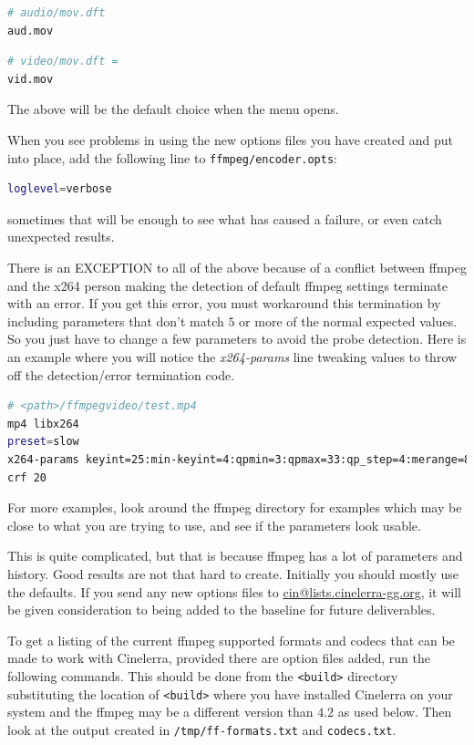 \begin{lstlisting}[language=bash,numbers=none]
# audio/mov.dft
aud.mov
\end{lstlisting}

\begin{lstlisting}[language=bash,numbers=none]
# video/mov.dft =
vid.mov
\end{lstlisting}

The above will be the default choice when the menu opens.  

When you see problems in using the new options files you have created and put into place, add the following line to \texttt{ffmpeg/encoder.opts}:

\begin{lstlisting}[language=bash,numbers=none]
loglevel=verbose
\end{lstlisting}

sometimes that will be enough to see what has caused a failure, or even catch unexpected results.

There is an \textsc{EXCEPTION} to all of the above because of a conflict between ffmpeg and the x264 person making the detection of default ffmpeg settings terminate with an error.  If you get this error, you must workaround this termination by including parameters that don't match $5$ or more of the normal expected values.  So you just have to change a few parameters to avoid the probe detection.  Here is an example where you will notice the \textit{x264-params} line tweaking values to throw off the detection/error termination code.

\begin{lstlisting}[language=bash,numbers=none]
# <path>/ffmpegvideo/test.mp4
mp4 libx264
preset=slow
x264-params keyint=25:min-keyint=4:qpmin=3:qpmax=33:qp_step=4:merange=8
crf 20
\end{lstlisting}

For more examples, look around the ffmpeg directory for examples which may be close to what you are trying to use, and see if the parameters look usable. 

This is quite complicated, but that is because ffmpeg has a lot of parameters and history.  Good results are not that hard to create.  Initially you should mostly use the defaults.  
If you send any new options files to \href{mailto:cin@lists.cinelerra-gg.org}{cin@lists.cinelerra-gg.org}, it will be given consideration to being added to the baseline for future deliverables.

To get a listing of the current ffmpeg supported formats and codecs that can be made to work with Cinelerra, provided there are option files added, run the following commands.  This should be done from the \texttt{<build>} directory substituting the location of \texttt{<build>} where you have installed Cinelerra on your system and the ffmpeg may be a different version than $4.2$ as used below.  Then look at the output created in \texttt{/tmp/ff-formats.txt} and \texttt{codecs.txt}.

